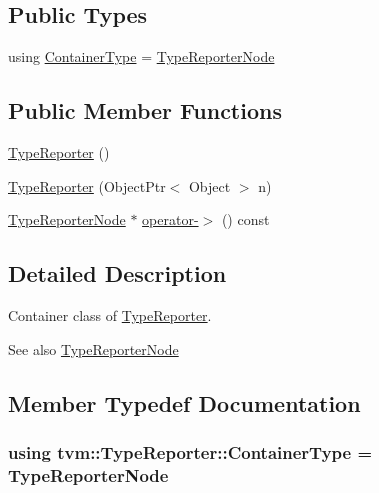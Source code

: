 \subsection*{Public Types}
\begin{DoxyCompactItemize}
\item 
using \hyperlink{classtvm_1_1TypeReporter_a976ec250155c399421aad906cfc3eee8}{Container\+Type} = \hyperlink{classtvm_1_1TypeReporterNode}{Type\+Reporter\+Node}
\end{DoxyCompactItemize}
\subsection*{Public Member Functions}
\begin{DoxyCompactItemize}
\item 
\hyperlink{classtvm_1_1TypeReporter_a8e7e05a07f9f7ad9bea91f27afac9051}{Type\+Reporter} ()
\item 
\hyperlink{classtvm_1_1TypeReporter_aa3dc38a3c84d324d0b3a9f358460a091}{Type\+Reporter} (Object\+Ptr$<$ Object $>$ n)
\item 
\hyperlink{classtvm_1_1TypeReporterNode}{Type\+Reporter\+Node} $\ast$ \hyperlink{classtvm_1_1TypeReporter_a23e7a5a55b562af8cfe9bf24297322a4}{operator-\/$>$} () const 
\end{DoxyCompactItemize}


\subsection{Detailed Description}
Container class of \hyperlink{classtvm_1_1TypeReporter}{Type\+Reporter}. 

\begin{DoxySeeAlso}{See also}
\hyperlink{classtvm_1_1TypeReporterNode}{Type\+Reporter\+Node} 
\end{DoxySeeAlso}


\subsection{Member Typedef Documentation}
\subsubsection[{\texorpdfstring{Container\+Type}{ContainerType}}]{\setlength{\rightskip}{0pt plus 5cm}using {\bf tvm\+::\+Type\+Reporter\+::\+Container\+Type} =  {\bf Type\+Reporter\+Node}}\hypertarget{classtvm_1_1TypeReporter_a976ec250155c399421aad906cfc3eee8}{}\label{classtvm_1_1TypeReporter_a976ec250155c399421aad906cfc3eee8}


